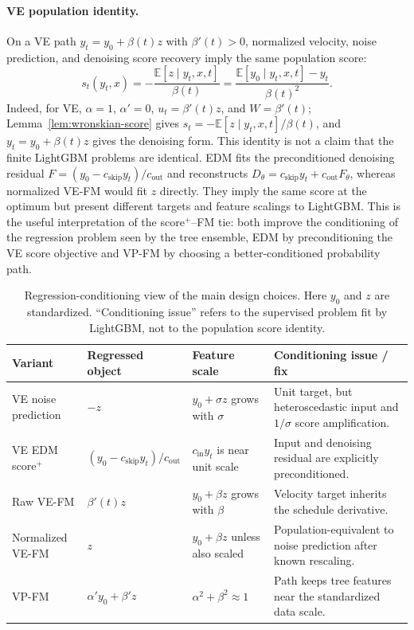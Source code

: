 \documentclass{article}
\newcommand{\E}{\mathbb{E}}
\begin{document}
\paragraph{VE population identity.} On a VE path $y_t=y_0+\beta(t)z$ with $\beta'(t)>0$, normalized velocity, noise prediction, and denoising score recovery imply the same population score:
\[
s_t(y_t,x)=-\frac{\E[z\mid y_t,x,t]}{\beta(t)}
          =\frac{\E[y_0\mid y_t,x,t]-y_t}{\beta(t)^2}.
\]
Indeed, for VE, $\alpha=1$, $\alpha'=0$, $u_t=\beta'(t)z$, and $W=\beta'(t)$; Lemma~\ref{lem:wronskian-score} gives $s_t=-\E[z\mid y_t,x,t]/\beta(t)$, and $y_t=y_0+\beta(t)z$ gives the denoising form. This identity is not a claim that the finite LightGBM problems are identical. EDM fits the preconditioned denoising residual $F=(y_0-c_{\mathrm{skip}}y_t)/c_{\mathrm{out}}$ and reconstructs $D_\theta=c_{\mathrm{skip}}y_t+c_{\mathrm{out}}F_\theta$, whereas normalized VE-FM would fit $z$ directly. They imply the same score at the optimum but present different targets and feature scalings to LightGBM. This is the useful interpretation of the score$^+$--FM tie: both improve the conditioning of the regression problem seen by the tree ensemble, EDM by preconditioning the VE score objective and VP-FM by choosing a better-conditioned probability path.

\begin{table}[!h]
  \centering
  \caption{Regression-conditioning view of the main design choices. Here $y_0$ and $z$ are standardized. ``Conditioning issue'' refers to the supervised problem fit by LightGBM, not to the population score identity.}\label{tab:conditioning}
  \scriptsize
  \begin{tabular}{p{}p{}p{}p{}}
    \toprule
    Variant & Regressed object & Feature scale & Conditioning issue / fix \\
    \midrule
    VE noise prediction & $-z$ & $y_0+\sigma z$ grows with $\sigma$ & Unit target, but heteroscedastic input and $1/\sigma$ score amplification. \\
    VE EDM score$^+$ & $(y_0-c_{\mathrm{skip}}y_t)/c_{\mathrm{out}}$ & $c_{\mathrm{in}}y_t$ is near unit scale & Input and denoising residual are explicitly preconditioned. \\
    Raw VE-FM & $\beta'(t)z$ & $y_0+\beta z$ grows with $\beta$ & Velocity target inherits the schedule derivative. \\
    Normalized VE-FM & $z$ & $y_0+\beta z$ unless also scaled & Population-equivalent to noise prediction after known rescaling. \\
    VP-FM & $\alpha' y_0+\beta' z$ & $\alpha^2+\beta^2\approx1$ & Path keeps tree features near the standardized data scale. \\
    \bottomrule
  \end{tabular}
\end{table}
\end{document}
